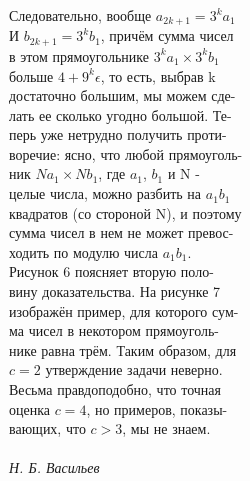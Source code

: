 \documentclass{article}
\begin{document}
\begin{multicols}{2}
\setlength{\parindent}{0pt} 
\indent Следовательно, вообще $a_{2k+1}=3^ka_1$\\
И $b_{2k+1}=3^kb_1$, причём сумма чисел\\
в этом прямоугольнике $3^ka_1\times3^kb_1$\\
больше $4+9^k\epsilon$, то есть, выбрав k\\
достаточно большим, мы можем сде-\\
лать ее сколько угодно большой. Те-\\
перь уже нетрудно получить проти-\\
воречие: ясно, что любой прямоуголь-\\
ник $Na_1\times Nb_1$, где $a_1$, $b_1$ и N - \\
целые числа, можно разбить на $a_1b_1$\\
квадратов (со стороной N), и поэтому\\
сумма чисел в нем не может превос-\\
ходить по модулю числа $a_1b_1$.\\
\setlength{\parindent}{20pt} 
\indent Рисунок 6 поясняет вторую поло-\\
вину доказательства. На рисунке 7\\
изображён пример, для которого сум-\\
ма чисел в некотором прямоуголь-\\
нике равна трём. Таким образом, для\\
$c=2$ утверждение задачи неверно. \\
Весьма правдоподобно, что точная\\
оценка $c=4$, но примеров, показы-\\
вающих, что $c>3$, мы не знаем.\\
\\
\setlength{\parindent}{130pt} 
\indent \emph{Н. Б. Васильев}
\end{multicols}
\end{document}
